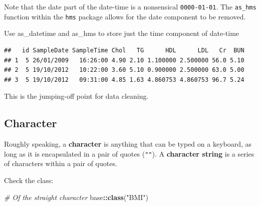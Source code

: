 \documentclass[
]{book}
\newenvironment{Shaded}{\begin{snugshade}}{\end{snugshade}}
\newcommand{\AttributeTok}[1]{\textcolor[rgb]{0.13,0.29,0.53}{#1}}
\newcommand{\CommentTok}[1]{\textcolor[rgb]{0.56,0.35,0.01}{\textit{#1}}}
\newcommand{\DataTypeTok}[1]{\textcolor[rgb]{0.13,0.29,0.53}{#1}}
\newcommand{\DecValTok}[1]{\textcolor[rgb]{0.00,0.00,0.81}{#1}}
\newcommand{\FunctionTok}[1]{\textcolor[rgb]{0.13,0.29,0.53}{\textbf{#1}}}
\newcommand{\NormalTok}[1]{#1}
\newcommand{\OtherTok}[1]{\textcolor[rgb]{0.56,0.35,0.01}{#1}}
\newcommand{\SpecialCharTok}[1]{\textcolor[rgb]{0.81,0.36,0.00}{\textbf{#1}}}
\newcommand{\StringTok}[1]{\textcolor[rgb]{0.31,0.60,0.02}{#1}}
\begin{document}
Note that the date part of the date-time is a nonsensical \texttt{0000-01-01}. The \texttt{as\_hms} function within the \texttt{hms} package allows for the date component to be removed.

Use as\_datetime and as\_hms to store just the time component of date-time

\begin{Shaded}
\end{Shaded}

\begin{verbatim}
##   id SampleDate SampleTime Chol   TG      HDL      LDL   Cr  BUN
## 1  5 26/01/2009   16:26:00 4.90 2.10 1.100000 2.500000 56.0 5.10
## 2  5 19/10/2012   10:22:00 3.60 5.10 0.900000 2.500000 63.0 5.00
## 3  5 19/10/2012   09:31:00 4.85 1.63 4.860753 4.860753 96.7 5.24
\end{verbatim}

This is the jumping-off point for data cleaning.

\subsection{Character}\label{sec:character}

Roughly speaking, a \textbf{character} is anything that can be typed on a keyboard, as long as it is encapsulated in a pair of quotes (\texttt{""}). A \textbf{character string} is a series of characters within a pair of quotes.

Check the class:

\begin{Shaded}
\begin{Highlighting}[]
\CommentTok{\# Of the straight character}
\NormalTok{base}\SpecialCharTok{::}\FunctionTok{class}\NormalTok{(}\StringTok{"BMI"}\NormalTok{)}
\end{Highlighting}
\end{Shaded}
\end{document}
